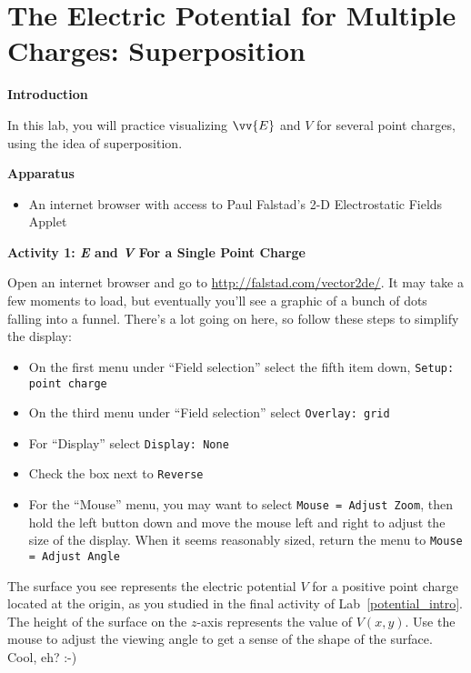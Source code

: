 \section{The Electric Potential for Multiple Charges: Superposition}
\label{potential_superposition}


\makelabheader %

\bigskip

\textbf{Introduction} 

In this lab, you will practice visualizing $\vv{E}$ and $V$ for several point charges, using the idea of superposition.

\textbf{Apparatus}

\begin{itemize}[nosep]
\item An internet browser with access to Paul Falstad's 2-D Electrostatic Fields Applet
\end{itemize}

\bigskip

\textbf{Activity 1: \textit{E} and \textit{V} For a Single Point Charge}

Open an internet browser and go to \href{http://falstad.com/vector2de/}{http://falstad.com/vector2de/}.  It may take a few moments to load, but eventually you'll see a graphic of a bunch of dots falling into a funnel.  There's a lot going on here, so follow these steps to simplify the display:
\begin{itemize}[nosep]
\item On the first menu under ``Field selection'' select the fifth item down, \verb!Setup: point charge!
\item On the third menu under ``Field selection'' select \verb!Overlay: grid!
\item For ``Display'' select \verb!Display: None!
\item Check the box next to \verb!Reverse!
\item For the ``Mouse'' menu, you may want to select \verb!Mouse = Adjust Zoom!, then hold the left button down and move the mouse left and right to adjust the size of the display.  When it seems reasonably sized, return the menu to \verb!Mouse = Adjust Angle!
\end{itemize}

The surface you see represents the electric potential $V$ for a positive point charge located at the origin, as you studied in the final activity of Lab~\ref{potential_intro}.  The height of the surface on the $z$-axis represents the value of $V(x,y)$.  Use the mouse to adjust the viewing angle to get a sense of the shape of the surface.  Cool, eh?  :-)

